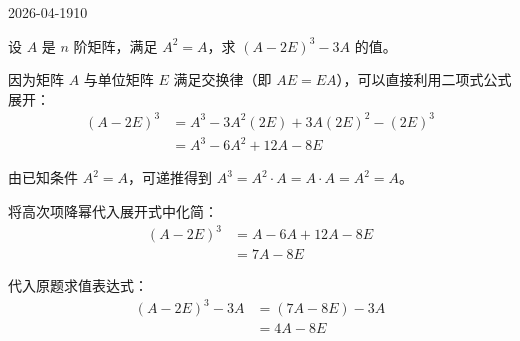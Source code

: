 \begin{mistake}{2026-04-19}{10}

\begin{problemcontent}
设 \(A\) 是 \(n\) 阶矩阵，满足 \(A^2 = A\)，求 \((A-2E)^3 - 3A\) 的值。
\end{problemcontent}

\begin{solutioncontent}
因为矩阵 \(A\) 与单位矩阵 \(E\) 满足交换律（即 \(AE = EA\)），可以直接利用二项式公式展开：
\[
\begin{aligned}
(A-2E)^3 &= A^3 - 3A^2(2E) + 3A(2E)^2 - (2E)^3 \\
&= A^3 - 6A^2 + 12A - 8E
\end{aligned}
\]

由已知条件 \(A^2 = A\)，可递推得到 \(A^3 = A^2 \cdot A = A \cdot A = A^2 = A\)。

将高次项降幂代入展开式中化简：
\[
\begin{aligned}
(A-2E)^3 &= A - 6A + 12A - 8E \\
&= 7A - 8E
\end{aligned}
\]

代入原题求值表达式：
\[
\begin{aligned}
(A-2E)^3 - 3A &= (7A - 8E) - 3A \\
&= 4A - 8E
\end{aligned}
\]
\end{solutioncontent}


\end{mistake}
